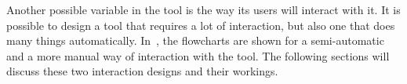 
Another possible variable in the tool is the way its users will interact with it. It is possible to design a tool that requires a lot of interaction, but also one that does many things automatically. In~, the flowcharts are shown for a semi-automatic and a more manual way of interaction with the tool. The following sections will discuss these two interaction designs and their workings.

